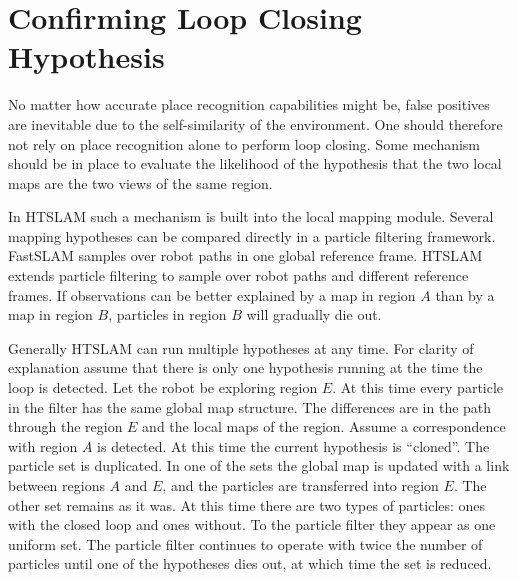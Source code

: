 %
%
%
%


\section{Confirming Loop Closing Hypothesis}
\label{sec:loop_confirm}

No matter how accurate place recognition capabilities might be, false
positives are inevitable due to the self-similarity of the
environment. One should therefore not rely on place recognition alone to
perform loop closing. Some mechanism should be in place to evaluate the
likelihood of the hypothesis that the two local maps are the two views
of the same region.

In HTSLAM such a mechanism is built into the local mapping
module. Several mapping hypotheses can be compared directly in a
particle filtering framework. FastSLAM samples over robot paths in one
global reference frame. HTSLAM extends particle filtering to sample
over robot paths and different reference frames. If observations can
be better explained by a map in region $A$ than by a map in region
$B$, particles in region $B$ will gradually die out.

Generally HTSLAM can run multiple hypotheses at any time. For clarity
of explanation assume that there is only one hypothesis running at the
time the loop is detected. Let the robot be exploring region $E$. At
this time every particle in the filter has the same global map
structure. The differences are in the path through the region $E$ and
the local maps of the region. Assume a correspondence with region $A$
is detected. At this time the current hypothesis is ``cloned''. The
particle set is duplicated. In one of the sets the global map is
updated with a link between regions $A$ and $E$, and the particles are
transferred into region $E$. The other set remains as it was. At this
time there are two types of particles: ones with the closed loop and
ones without. To the particle filter they appear as one uniform
set. The particle filter continues to operate with twice the number of
particles until one of the hypotheses dies out, at which time the set
is reduced.

